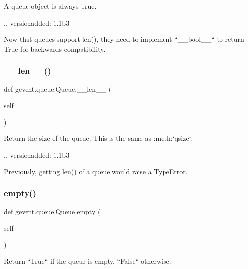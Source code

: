 \begin{DoxyVerb}A queue object is always True.

.. versionadded: 1.1b3

   Now that queues support len(), they need to implement ``__bool__``
   to return True for backwards compatibility.
\end{DoxyVerb}
 \mbox{\label{classgevent_1_1queue_1_1_queue_a1b2a3b67717cdb6fd8200c751d30d14a}} 
\subsubsection{\texorpdfstring{\+\_\+\+\_\+len\+\_\+\+\_\+()}{\_\_len\_\_()}}
{\footnotesize\ttfamily def gevent.\+queue.\+Queue.\+\_\+\+\_\+len\+\_\+\+\_\+ (\begin{DoxyParamCaption}\item[{}]{self }\end{DoxyParamCaption})}

\begin{DoxyVerb}Return the size of the queue. This is the same as :meth:`qsize`.

.. versionadded: 1.1b3

    Previously, getting len() of a queue would raise a TypeError.
\end{DoxyVerb}
 \mbox{\label{classgevent_1_1queue_1_1_queue_a1534373d379168ae9408af6b632df285}} 
\subsubsection{\texorpdfstring{empty()}{empty()}}
{\footnotesize\ttfamily def gevent.\+queue.\+Queue.\+empty (\begin{DoxyParamCaption}\item[{}]{self }\end{DoxyParamCaption})}

\begin{DoxyVerb}Return ``True`` if the queue is empty, ``False`` otherwise.\end{DoxyVerb}
 \mbox{\label{classgevent_1_1queue_1_1_queue_a064875ef1eac4c3a222340e8feb34b60}} 
